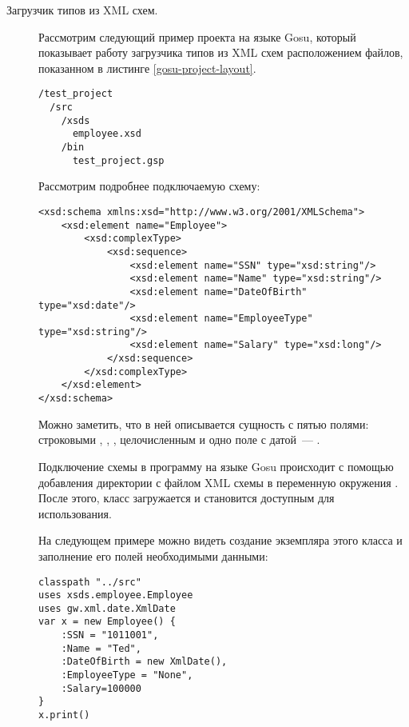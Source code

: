 \begin{description}
\item[Загрузчик типов из XML схем.] Рассмотрим следующий пример проекта на языке Gosu, который показывает работу загрузчика типов из XML схем расположением файлов, показанном в листинге \ref{gosu-project-layout}.

\begin{code}\begin{lstlisting}[caption={Расположение файлов в примере загрузчиков типов на языке Gosu, использующее загрузку типов из XML схем.}, label=gosu-project-layout]
/test_project
  /src
    /xsds
      employee.xsd
    /bin
      test_project.gsp
\end{lstlisting}\end{code}

\begin{code}
Рассмотрим подробнее подключаемую схему:
\begin{lstlisting}[caption={Содержимое файла \texttt{employee.xsd} из примера~\ref{gosu-project-layout}.}, label=gosu-employee-xsd]
<xsd:schema xmlns:xsd="http://www.w3.org/2001/XMLSchema">
    <xsd:element name="Employee">
        <xsd:complexType>
            <xsd:sequence>
                <xsd:element name="SSN" type="xsd:string"/>
                <xsd:element name="Name" type="xsd:string"/>
                <xsd:element name="DateOfBirth" type="xsd:date"/>
                <xsd:element name="EmployeeType" type="xsd:string"/>
                <xsd:element name="Salary" type="xsd:long"/>
            </xsd:sequence>
        </xsd:complexType>
    </xsd:element>
</xsd:schema>
\end{lstlisting}\end{code}

Можно заметить, что в ней описывается сущность  с пятью полями: строковыми
, , , целочисленным 
и одно поле с датой~--- .

Подключение схемы в программу на языке Gosu происходит с помощью добавления директории с файлом XML схемы в переменную окружения .
После этого, класс  загружается и становится доступным для использования.

\begin{code}
На следующем примере можно видеть создание экземпляра этого класса и заполнение его полей необходимыми данными:

\begin{lstlisting}[caption={Содержимое файла \texttt{test\_project.gsp} из примера~\ref{gosu-project-layout}.}, label=gosu-xsd-loader]
classpath "../src"
uses xsds.employee.Employee
uses gw.xml.date.XmlDate
var x = new Employee() {
    :SSN = "1011001",
    :Name = "Ted",
    :DateOfBirth = new XmlDate(),
    :EmployeeType = "None",
    :Salary=100000
}
x.print()
\end{lstlisting}


\end{code}
\end{description}
